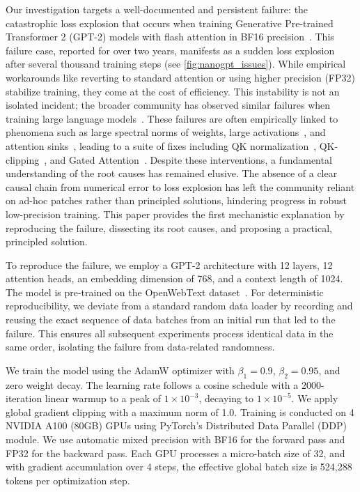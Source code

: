 \documentclass{article} %
\begin{document}
Our investigation targets a well-documented and persistent failure: the catastrophic loss explosion that occurs when training Generative Pre-trained Transformer 2 (GPT-2) models with flash attention in BF16 precision~\citep{nanogpt_issue303,nanogpt_issue524,nanogpt_issue554}. This failure case, reported for over two years, manifests as a sudden loss explosion after several thousand training steps (see \cref{fig:nanogpt_issues}). While empirical workarounds like reverting to standard attention or using higher precision (FP32) stabilize training, they come at the cost of efficiency. This instability is not an isolated incident; the broader community has observed similar failures when training large language models~\citep{team2025kimi,qwen3technicalreport}. These failures are often empirically linked to phenomena such as large spectral norms of weights, large activations~\citep{yang2023spectral,rybakov2024methods}, and attention sinks~\citep{xiao2023efficient}, leading to a suite of fixes including QK normalization~\citep{henry2020query,qwen3technicalreport}, QK-clipping~\citep{team2025kimi}, and Gated Attention~\citep{qiu2025gated,qwen3technicalreport}. Despite these interventions, a fundamental understanding of the root causes has remained elusive. The absence of a clear causal chain from numerical error to loss explosion has left the community reliant on ad-hoc patches rather than principled solutions, hindering progress in robust low-precision training. This paper provides the first mechanistic explanation by reproducing the failure, dissecting its root causes, and proposing a practical, principled solution.



To reproduce the failure, we employ a GPT-2 architecture with 12 layers, 12 attention heads, an embedding dimension of 768, and a context length of 1024. The model is pre-trained on the OpenWebText dataset~\citep{Gokaslan2019OpenWeb}. 
For deterministic reproducibility, we deviate from a standard random data loader by recording and reusing the exact sequence of data batches from an initial run that led to the failure. 
This ensures all subsequent experiments process identical data in the same order, isolating the failure from data-related randomness.

We train the model using the AdamW optimizer with $\beta_1=0.9$, $\beta_2=0.95$, and zero weight decay. 
The learning rate follows a cosine schedule with a 2000-iteration linear warmup to a peak of $1 \times 10^{-3}$, decaying to $1 \times 10^{-5}$. 
We apply global gradient clipping with a maximum norm of 1.0. 
Training is conducted on 4 NVIDIA A100 (80GB) GPUs using PyTorch's Distributed Data Parallel (DDP) module. 
We use automatic mixed precision with BF16 for the forward pass and FP32 for the backward pass. 
Each GPU processes a micro-batch size of 32, and with gradient accumulation over 4 steps, 
the effective global batch size is 524,288 tokens per optimization step.
\end{document}
